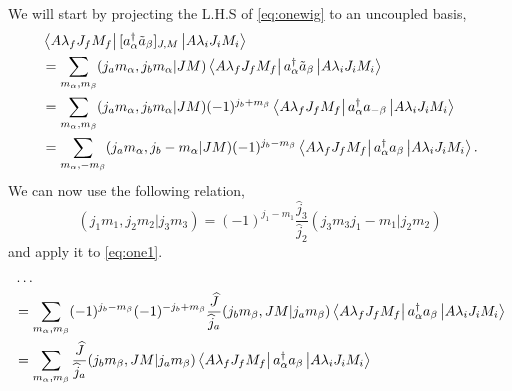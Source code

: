\documentclass[12pt,a4paper]{article}
\newcommand{\matrixel}[3]{\left\langle #1 \vphantom{#2#3} \right|
 #2 \left| #3 \vphantom{#1#2} \right\rangle} %
\begin{document}
We will start by projecting the L.H.S of \eqref{eq:onewig} to an uncoupled basis,
\begin{align}
\begin{split}
&\matrixel{A \lambda_fJ_fM_f}{[a^{\dagger}_{\alpha}\tilde{a}_{\beta}]_{J,M}}{A \lambda_i J_i M_i} \\
&=\sum_{m_{\alpha}, m_{\beta}}(j_a m_{\alpha}, j_b m_{\alpha}|J M)\matrixel{A \lambda_fJ_fM_f}{a^{\dagger}_{\alpha}\tilde{a}_{\beta}}{A \lambda_i J_i M_i} \\
&=\sum_{m_{\alpha}, m_{\beta}}(j_a m_{\alpha}, j_b m_{\alpha}|J M)(-1)^{j_b+m_{\beta}} \matrixel{A \lambda_fJ_fM_f}{a^{\dagger}_{\alpha}a_{-\beta}}{A \lambda_i J_i M_i} \\
&=\sum_{m_{\alpha}, -m_{\beta}}(j_a m_{\alpha}, j_b -m_{\alpha}|J M)(-1)^{j_b-m_{\beta}}\matrixel{A \lambda_f J_fM_f}{a^{\dagger}_{\alpha}a_{\beta}}{A \lambda_i J_i M_i}. \\
\label{eq:one1}
\end{split}
\end{align}
We can now use the following relation, \begin{equation}
(j_1m_1,j_2m_2|j_3 m_3)=(-1)^{j_1-m_1}\frac{\widehat{j}_3}{\widehat{j}_2} (j_3m_3 j_1-m_1|j_2 m_2)
\end{equation}
and apply it to \eqref{eq:one1}.
\begin{align}
\begin{split}
&\hdots \\
&=\sum_{m_{\alpha},m_{\beta}}(-1)^{j_b-m_{\beta}}(-1)^{-j_b+m_{\beta}}\frac{\widehat{J}}{\widehat{j}_a}(j_b m_{\beta},JM|j_a m_{\beta}) \matrixel{A \lambda_f J_fM_f}{a^{\dagger}_{\alpha}a_{\beta}}{A \lambda_i J_i M_i}\\
&=\sum_{m_{\alpha},m_{\beta}}\frac{\widehat{J}}{\widehat{j}_a} (j_b m_{\beta},JM|j_a m_{\beta})\matrixel{A \lambda_f J_fM_f}{a^{\dagger}_{\alpha}a_{\beta}}{A \lambda_i J_i M_i}\\
\label{eq:one2}
\end{split}
\end{align}
\end{document}
